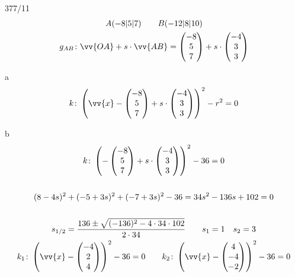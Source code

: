 \begin{exercise}{377/11}
  \begin{gather*}
    A(-8|5|7) \qquad B(-12|8|10) \\
    g_{AB} \colon \vv{OA} + s \cdot \vv{AB} = \begin{pmatrix}-8 \\ 5 \\ 7\end{pmatrix} + s \cdot \begin{pmatrix}-4 \\ 3 \\ 3\end{pmatrix} \\
  \end{gather*}
  \item [a]
  \begin{gather*}
    k \colon \left(\vv{x} - \begin{pmatrix}-8 \\ 5 \\ 7\end{pmatrix} + s \cdot \begin{pmatrix}-4 \\ 3 \\ 3\end{pmatrix}\right)^2 - r^2 = 0
  \end{gather*}
  \item [b]
  \begin{gather*}
    k \colon \left(-\begin{pmatrix}-8 \\ 5 \\ 7\end{pmatrix} + s \cdot \begin{pmatrix}-4 \\ 3 \\ 3\end{pmatrix}\right)^2 - 36 = 0 \\\\
    (8 - 4s)^2 + (-5 + 3s)^2 + (-7 + 3s)^2 - 36 = 34s^2 - 136s + 102 = 0 \\\\
    s_{1/2} = \frac{136 \pm \sqrt{(-136)^2 - 4 \cdot 34 \cdot 102}}{2 \cdot 34} \qquad s_1 = 1 \quad s_2 = 3 \\
    k_1 \colon \left(\vv{x} - \begin{pmatrix}-4 \\ 2 \\ 4\end{pmatrix}\right)^2 - 36 = 0 \qquad k_2 \colon \left(\vv{x} - \begin{pmatrix}4 \\ -4 \\ -2\end{pmatrix}\right)^2 - 36 = 0 \\

\end{gather*}
\end{exercise}
